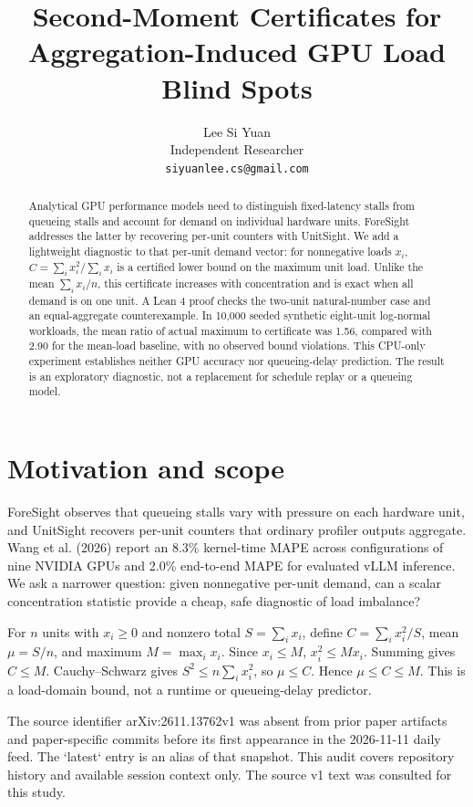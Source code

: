 \documentclass[11pt]{article}
\title{Second-Moment Certificates for Aggregation-Induced GPU Load Blind Spots}
\author{Lee Si Yuan \\
  Independent Researcher \\
  \texttt{siyuanlee.cs@gmail.com}}
\begin{document}
\maketitle
\begin{abstract}
Analytical GPU performance models need to distinguish fixed-latency stalls from queueing stalls and account for demand on individual hardware units. ForeSight addresses the latter by recovering per-unit counters with UnitSight. We add a lightweight diagnostic to that per-unit demand vector: for nonnegative loads $x_i$, $C=\sum_i x_i^2/\sum_i x_i$ is a certified lower bound on the maximum unit load. Unlike the mean $\sum_i x_i/n$, this certificate increases with concentration and is exact when all demand is on one unit. A Lean 4 proof checks the two-unit natural-number case and an equal-aggregate counterexample. In 10,000 seeded synthetic eight-unit log-normal workloads, the mean ratio of actual maximum to certificate was 1.56, compared with 2.90 for the mean-load baseline, with no observed bound violations. This CPU-only experiment establishes neither GPU accuracy nor queueing-delay prediction. The result is an exploratory diagnostic, not a replacement for schedule replay or a queueing model.
\end{abstract}
\section{Motivation and scope}
ForeSight observes that queueing stalls vary with pressure on each hardware unit, and UnitSight recovers per-unit counters that ordinary profiler outputs aggregate. Wang et al. (2026) report an 8.3\% kernel-time MAPE across configurations of nine NVIDIA GPUs and 2.0\% end-to-end MAPE for evaluated vLLM inference. We ask a narrower question: given nonnegative per-unit demand, can a scalar concentration statistic provide a cheap, safe diagnostic of load imbalance?

For $n$ units with $x_i\ge0$ and nonzero total $S=\sum_i x_i$, define $C=\sum_i x_i^2/S$, mean $\mu=S/n$, and maximum $M=\max_i x_i$. Since $x_i\le M$, $x_i^2\le Mx_i$. Summing gives $C\le M$. Cauchy--Schwarz gives $S^2\le n\sum_i x_i^2$, so $\mu\le C$. Hence $\mu\le C\le M$. This is a load-domain bound, not a runtime or queueing-delay predictor.

The source identifier arXiv:2611.13762v1 was absent from prior paper artifacts and paper-specific commits before its first appearance in the 2026-11-11 daily feed. The `latest` entry is an alias of that snapshot. This audit covers repository history and available session context only. The source v1 text was consulted for this study.
\end{document}
